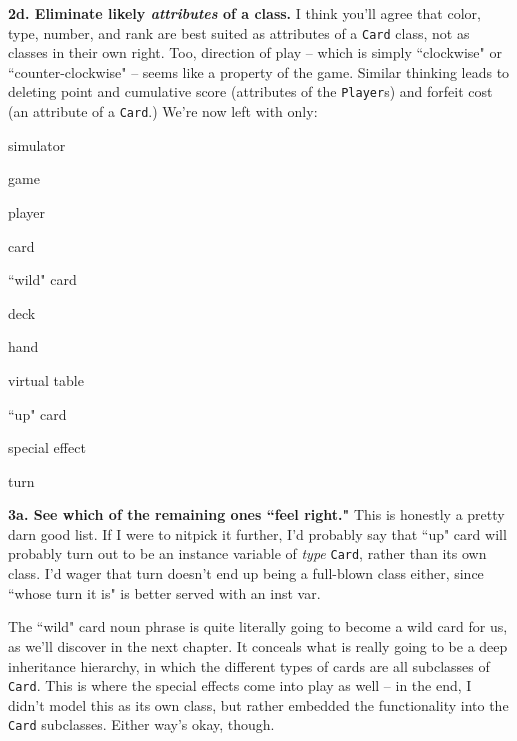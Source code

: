 \vspace{.1in}
\textbf{2d. Eliminate likely \textit{attributes} of a class.} I think you'll
agree that \textsf{color}, \textsf{type}, \textsf{number}, and \textsf{rank}
are best suited as attributes of a \texttt{Card} class, not as classes in
their own right. Too, \textsf{direction of play} -- which is simply
``clockwise" or ``counter-clockwise" -- seems like a property of the
\textsf{game}. Similar thinking leads to deleting \textsf{point} and
\textsf{cumulative score} (attributes of the \texttt{Player}s) and
\textsf{forfeit cost} (an attribute of a \texttt{Card}.) We're now left with
only:

\begin{samepage}
\begin{multicols}{3}
\small
\begin{compactitem}
\renewcommand\labelitemi{\raisebox{0.25ex}{\tiny$\bullet$}}
\item \textsf{simulator}
\item \textsf{game}
\item \textsf{player}
\item \textsf{card}
\columnbreak
\item \textsf{``wild" card}
\item \textsf{deck}
\item \textsf{hand}
\item \textsf{virtual table}
\columnbreak
\item \textsf{``up" card}
\item \textsf{special effect}
\item \textsf{turn}
\end{compactitem}
\end{multicols}
\end{samepage}


\textbf{3a. See which of the remaining ones ``feel right."} This is honestly a
pretty darn good list. If I were to nitpick it further, I'd probably say that
\textsf{``up" card} will probably turn out to be an instance variable of
\textit{type} \texttt{Card}, rather than its own class. I'd wager that
\textsf{turn} doesn't end up being a full-blown class either, since ``whose
turn it is" is better served with an inst var.

The \textsf{``wild" card} noun phrase is quite literally going to become a
wild card for us, as we'll discover in the next chapter. It conceals what is
really going to be a deep inheritance hierarchy, in which the different types
of cards are all subclasses of \texttt{Card}. This is where the
\textsf{special effect}s come into play as well -- in the end, I didn't model
this as its own class, but rather embedded the functionality into the
\texttt{Card} subclasses. Either way's okay, though.

